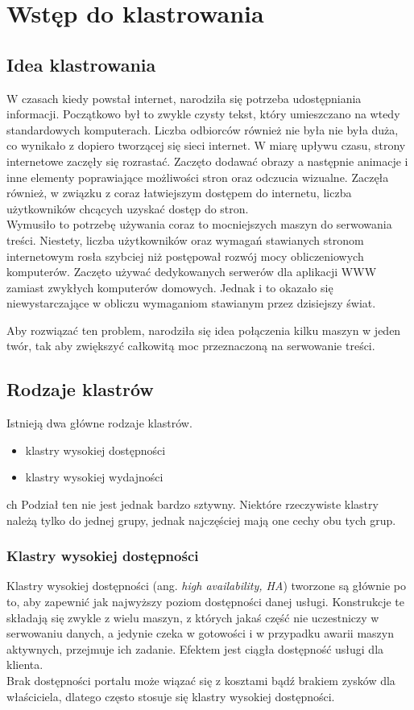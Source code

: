 \chapter{Wstęp do klastrowania}
\label{ch:wstep_do_klastrowania}
\section{Idea klastrowania}
W czasach kiedy powstał internet, narodziła się potrzeba udostępniania informacji. Początkowo był to zwykle czysty tekst, który umieszczano na wtedy standardowych komputerach. Liczba odbiorców również nie była nie była duża, co wynikało z dopiero tworzącej się sieci internet.
W miarę upływu czasu, strony internetowe zaczęły się rozrastać. Zaczęto dodawać obrazy a następnie animacje i inne elementy poprawiające możliwości stron oraz odczucia wizualne. Zaczęła również, w związku z coraz łatwiejszym dostępem do internetu, liczba użytkowników chcących uzyskać dostęp do stron.\\
Wymusiło to potrzebę używania coraz to mocniejszych maszyn do serwowania treści. Niestety, liczba użytkowników oraz wymagań stawianych stronom internetowym rosła szybciej niż postępował rozwój mocy obliczeniowych komputerów. Zaczęto używać dedykowanych serwerów dla aplikacji WWW zamiast zwykłych komputerów domowych. Jednak i to okazało się niewystarczające w obliczu wymaganiom stawianym przez dzisiejszy świat.

Aby rozwiązać ten problem, narodziła się idea połączenia kilku maszyn w jeden twór, tak aby zwiększyć całkowitą moc przeznaczoną na serwowanie treści.
\section{Rodzaje klastrów}
Istnieją dwa główne rodzaje klastrów.
\begin{itemize}
\item klastry wysokiej dostępności
\item klastry wysokiej wydajności
\end{itemize}ch 
Podział ten nie jest jednak bardzo sztywny.
Niektóre rzeczywiste klastry należą tylko do jednej grupy, jednak najczęściej mają one cechy obu tych grup.
\subsection{Klastry wysokiej dostępności}
Klastry wysokiej dostępności (ang. \textit{high availability, HA}) tworzone są głównie po to, aby zapewnić jak najwyższy poziom dostępności danej usługi.
Konstrukcje te składają się zwykle z wielu maszyn, z których jakaś część nie uczestniczy w serwowaniu danych, a jedynie czeka w gotowości i w przypadku awarii maszyn aktywnych, przejmuje ich zadanie. Efektem jest ciągła dostępność usługi dla klienta.\\
Brak dostępności portalu może wiązać się z kosztami bądź brakiem zysków dla właściciela, dlatego często stosuje się klastry wysokiej dostępności.
